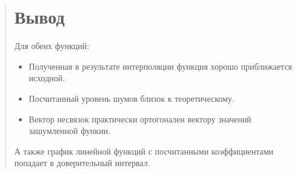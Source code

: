 \documentclass{article}
\begin{document}
\begin{quote}
\section{Вывод}
  Для обеих функций:
  \begin{itemize}
    \item Полученная в результате интерполяции функция хорошо приближается исходной.
    \item Посчитанный уровень шумов близок к теоретическому.
    \item Вектор несвязок практически ортогонален вектору значений зашумленной функии.
  \end{itemize}
  А также график линейной функций с посчитанными коэффициентами попадает в доверительный интервал.
\end{quote}
\end{document}
